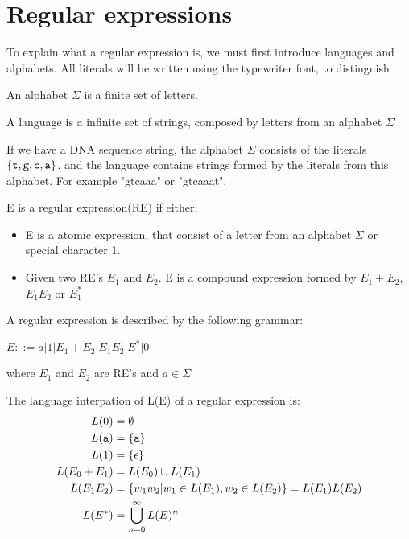 \section{Regular expressions} 
  To explain what a regular expression is, we must first introduce languages and alphabets. All literals will be written using the typewriter font, to distinguish 
\begin{mydef}\label{alph}
An alphabet $\Sigma$ is a finite set of letters.
\end{mydef}

\begin{mydef}\label{lang}
A language is a infinite set of strings, composed by letters from an alphabet $\Sigma$
\end{mydef}

\begin{myex}
If we have a DNA sequence string, the alphabet $\Sigma$ consists of the literals ${\tt\{t,g,c,a\}}$. and the language contains strings formed by the literals from this alphabet. For example "gtcaaa" or "gtcaaat". 
\end{myex}

\begin{mydef}
E is a regular expression(RE) if either:
\begin{itemize} 
\item E is a atomic expression, that consist of a letter from an alphabet $\Sigma$ or special character 1.
\item Given two RE's $E_1$ and $E_2$. E is a compound expression formed by $E_1 + E_2$, $E_1 E_2$ or $E_1 ^*$ 
\end{itemize}
\end{mydef}



\begin{mydef}
A regular expression is described by the following grammar: \\
\begin{center}
$E::= a|1|E_1 + E_2 |E_1 E_2 | E^* | 0$
\end{center}
where $E_1$ and $E_2$ are RE's and $a \in \Sigma$
\end{mydef}

\begin{mydef}\centering
The language interpation of L(E) of a regular expression is: 
\begin{align*}
L(0)           &= \emptyset\\
L({\tt a})     &= \{{\tt a}\} \\
L(1)         &= \{\epsilon\} \\
L(E_0 + E_1) &= L(E_0) \cup L(E_1) \\
L(E_1 E_2)   &= \{w_1w_2 | w_1 \in L(E_1),w_2 \in L(E_2)\}=L(E_1)L(E_2) \\
L(E^*)       &= \bigcup\limits_{n=0}^\infty L(E)^n 
\end{align*}
\end{mydef}

